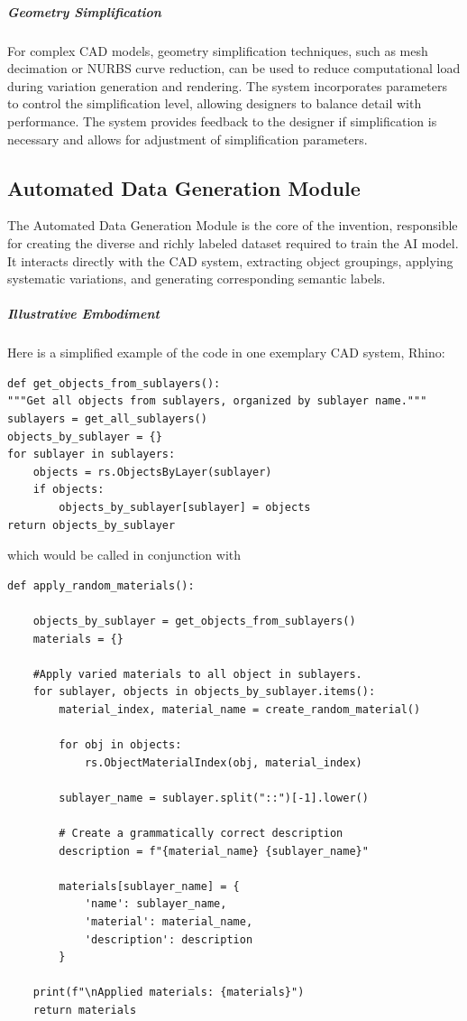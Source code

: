 \documentclass[12pt]{article}
\begin{document}
\subparagraph{Geometry Simplification}
For complex CAD models, geometry simplification techniques, such as mesh decimation or NURBS curve reduction, can be used to reduce computational load during variation generation and rendering. The system incorporates parameters to control the simplification level, allowing designers to balance detail with performance. The system provides feedback to the designer if simplification is necessary and allows for adjustment of simplification parameters.

\subsection{Automated Data Generation Module}

The Automated Data Generation Module is the core of the invention, responsible for creating the diverse and richly labeled dataset required to train the AI model. It interacts directly with the CAD system, extracting object groupings, applying systematic variations, and generating corresponding semantic labels.


\subparagraph{Illustrative Embodiment} 

Here is a simplified example of the code in one exemplary CAD system, Rhino:

\begin{verbatim}
def get_objects_from_sublayers():
"""Get all objects from sublayers, organized by sublayer name."""
sublayers = get_all_sublayers()
objects_by_sublayer = {}
for sublayer in sublayers:
    objects = rs.ObjectsByLayer(sublayer)
    if objects:
        objects_by_sublayer[sublayer] = objects
return objects_by_sublayer

\end{verbatim}  

which would be called in conjunction with 

\begin{verbatim}
def apply_random_materials():

    objects_by_sublayer = get_objects_from_sublayers()
    materials = {}
    
    #Apply varied materials to all object in sublayers.
    for sublayer, objects in objects_by_sublayer.items():
        material_index, material_name = create_random_material()
        
        for obj in objects:
            rs.ObjectMaterialIndex(obj, material_index)
        
        sublayer_name = sublayer.split("::")[-1].lower()
        
        # Create a grammatically correct description
        description = f"{material_name} {sublayer_name}"
        
        materials[sublayer_name] = {
            'name': sublayer_name,
            'material': material_name,
            'description': description
        }
    
    print(f"\nApplied materials: {materials}")
    return materials

\end{verbatim}  
\end{document}
